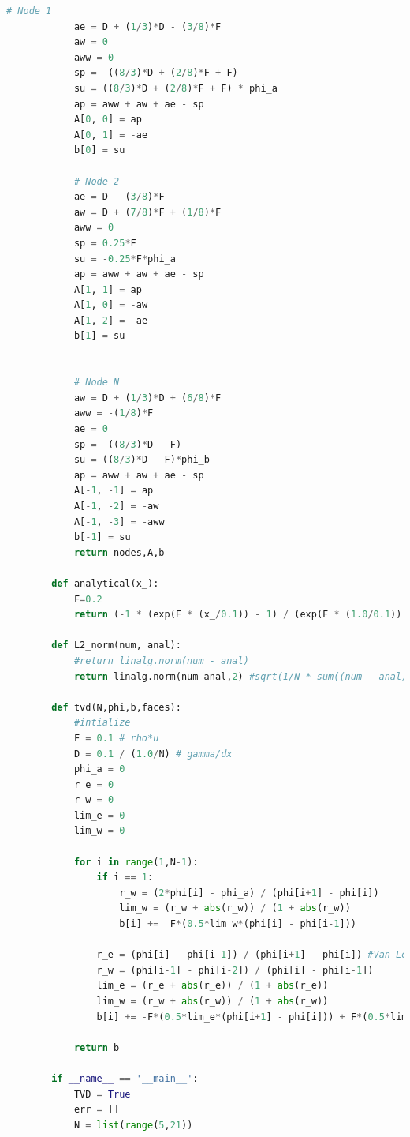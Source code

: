 \documentclass[paper=a4, fontsize=11pt]{article} %
\numberwithin{equation}{section} %
\numberwithin{figure}{section} %
\numberwithin{table}{section} %
\begin{document}
\begin{center}
\begin{lstlisting}[language=Python, captionpos = b, caption=Source code for excercise 1]
            # Node 1
            ae = D + (1/3)*D - (3/8)*F
            aw = 0
            aww = 0
            sp = -((8/3)*D + (2/8)*F + F)
            su = ((8/3)*D + (2/8)*F + F) * phi_a
            ap = aww + aw + ae - sp
            A[0, 0] = ap
            A[0, 1] = -ae
            b[0] = su
        
            # Node 2
            ae = D - (3/8)*F
            aw = D + (7/8)*F + (1/8)*F
            aww = 0
            sp = 0.25*F
            su = -0.25*F*phi_a
            ap = aww + aw + ae - sp
            A[1, 1] = ap
            A[1, 0] = -aw
            A[1, 2] = -ae
            b[1] = su
            
        
            # Node N
            aw = D + (1/3)*D + (6/8)*F
            aww = -(1/8)*F
            ae = 0
            sp = -((8/3)*D - F)
            su = ((8/3)*D - F)*phi_b
            ap = aww + aw + ae - sp
            A[-1, -1] = ap
            A[-1, -2] = -aw
            A[-1, -3] = -aww
            b[-1] = su
            return nodes,A,b
        
        def analytical(x_):
            F=0.2
            return (-1 * (exp(F * (x_/0.1)) - 1) / (exp(F * (1.0/0.1)) - 1)) + 1
        
        def L2_norm(num, anal):
            #return linalg.norm(num - anal)
            return linalg.norm(num-anal,2) #sqrt(1/N * sum((num - anal)**2))
        
        def tvd(N,phi,b,faces):
            #intialize
            F = 0.1 # rho*u
            D = 0.1 / (1.0/N) # gamma/dx
            phi_a = 0 
            r_e = 0
            r_w = 0
            lim_e = 0
            lim_w = 0
            
            for i in range(1,N-1):
                if i == 1:
                    r_w = (2*phi[i] - phi_a) / (phi[i+1] - phi[i])
                    lim_w = (r_w + abs(r_w)) / (1 + abs(r_w))
                    b[i] +=  F*(0.5*lim_w*(phi[i] - phi[i-1]))
        
                r_e = (phi[i] - phi[i-1]) / (phi[i+1] - phi[i]) #Van Leer limiter
                r_w = (phi[i-1] - phi[i-2]) / (phi[i] - phi[i-1])
                lim_e = (r_e + abs(r_e)) / (1 + abs(r_e))
                lim_w = (r_w + abs(r_w)) / (1 + abs(r_w))
                b[i] += -F*(0.5*lim_e*(phi[i+1] - phi[i])) + F*(0.5*lim_w*(phi[i] - phi[i-1])) 
        
            return b
        
        if __name__ == '__main__':
            TVD = True
            err = []
            N = list(range(5,21))
        

\end{lstlisting}
\end{center}
\end{document}
